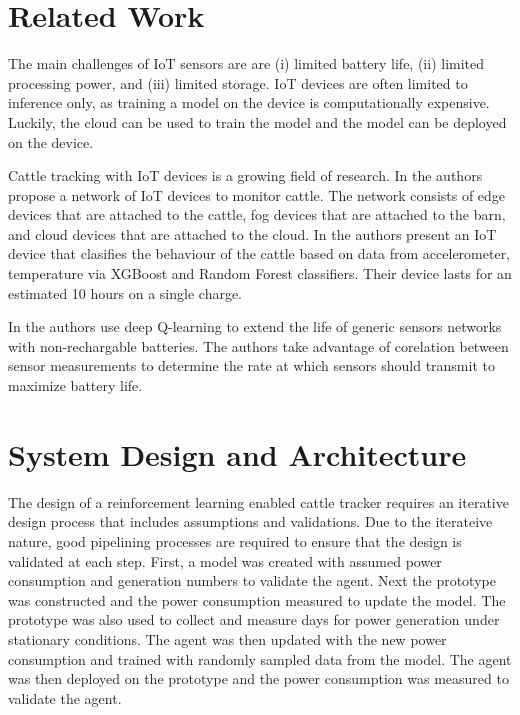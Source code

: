 \documentclass[10pt]{cai}
\begin{document}
\section{Related Work}
The main challenges of IoT sensors are \cite{chenDeepReinforcementLearning2021} are (i) limited battery life, (ii) limited processing power, and (iii) limited storage.
IoT devices are often limited to inference only, as training a model on the device is computationally expensive.
Luckily, the cloud can be used to train the model and the model can be deployed on the device.

Cattle tracking with IoT devices is a growing field of research. In \cite{yamsaniIoTBasedLivestockMonitoring2024} the authors propose a network of IoT devices to monitor cattle.
The network consists of edge devices that are attached to the cattle, fog devices that are attached to the barn, and cloud devices that are attached to the cloud. 
In \cite{duttaMOOnitorIoTBased2022} the authors present an IoT device that clasifies the behaviour of the cattle based on data from accelerometer, temperature via XGBoost and Random Forest classifiers.
Their device lasts for an estimated 10 hours on a single charge.

In \cite{hribarUsingDeepQLearning2019} the authors use deep Q-learning to extend the life of generic sensors networks with non-rechargable batteries. 
The authors take advantage of corelation between sensor measurements to determine the rate at which sensors should transmit to maximize battery life.



\section{System Design and Architecture}
The design of a reinforcement learning enabled cattle tracker requires an iterative design process that includes assumptions and validations.
Due to the iterateive nature, good pipelining processes are required to ensure that the design is validated at each step.
First, a model was created with assumed power consumption and generation numbers to validate the agent.
Next the prototype was constructed and the power consumption measured to update the model.
The prototype was also used to collect and measure days for power generation under stationary conditions.
The agent was then updated with the new power consumption and trained with randomly sampled data from the model.
The agent was then deployed on the prototype and the power consumption was measured to validate the agent.
\end{document}
